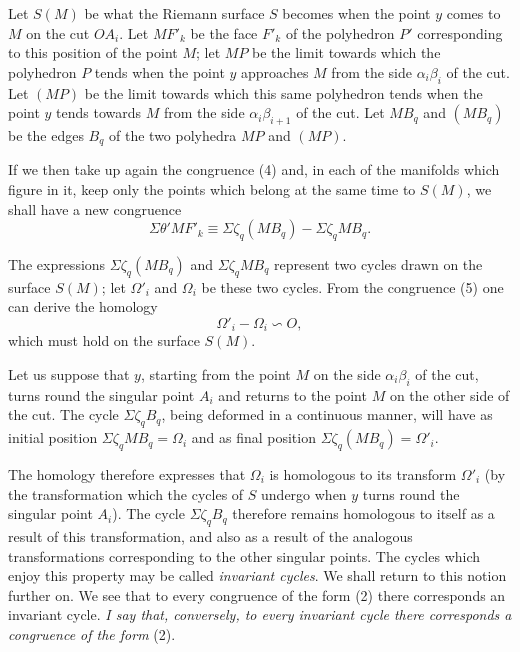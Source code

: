 \documentclass{article}
\begin{document}
Let $S(M)$ be what the Riemann surface $S$ becomes when the point $y$ comes to $M$ on the cut $OA_{i}$. Let $MF'_{k}$ be the face $F'_{k}$ of the polyhedron $P'$ corresponding to this position of the point $M$; let $MP$ be the limit towards which the polyhedron $P$ tends when the point $y$ approaches $M$ from the side $\alpha_{i}\beta_{i}$ of the cut. Let $(MP)$ be the limit towards which this same polyhedron tends when the point $y$ tends towards $M$ from the side $\alpha_{i}\beta_{i+1}$ of the cut. Let $MB_{q}$ and $(MB_{q})$ be the edges $B_{q}$ of the two polyhedra $MP$ and $(MP)$.

If we then take up again the congruence (4) and, in each of the manifolds which figure in it, keep only the points which belong at the same time to $S(M)$, we shall have a new congruence
\[ \Sigma \theta' MF'_{k} \equiv \Sigma \zeta_{q} (MB_{q}) - \Sigma \zeta_{q} MB_{q}. \tag{5} \]

The expressions $\Sigma \zeta_{q} (MB_{q})$ and $\Sigma \zeta_{q} MB_{q}$ represent two cycles drawn on the surface $S(M)$; let $\Omega'_{i}$ and $\Omega_{i}$ be these two cycles. From the congruence (5) one can derive the homology
\[ \Omega'_{i} - \Omega_{i} \backsim O, \tag{6} \]
which must hold on the surface $S(M)$.


Let us suppose that $y$, starting from the point $M$ on the side $\alpha_{i}\beta_{i}$ of the cut, turns round the singular point $A_{i}$ and returns to the point $M$ on the other side of the cut. The cycle $\Sigma \zeta_{q} B_{q}$, being deformed in a continuous manner, will have as initial position $\Sigma \zeta_{q} MB_{q} = \Omega_{i}$ and as final position $\Sigma \zeta_{q} (MB_{q}) = \Omega'_{i}$.

The homology therefore expresses that $\Omega_{i}$ is homologous to its transform $\Omega'_{i}$ (by the transformation which the cycles of $S$ undergo when $y$ turns round the singular point $A_{i}$). The cycle $\Sigma \zeta_{q} B_{q}$ therefore remains homologous to itself as a result of this transformation, and also as a result of the analogous transformations corresponding to the other singular points. The cycles which enjoy this property may be called \emph{invariant cycles}. We shall return to this notion further on. We see that to every congruence of the form (2) there corresponds an invariant cycle. \emph{I say that, conversely, to every invariant cycle there corresponds a congruence of the form} (2).
\end{document}
